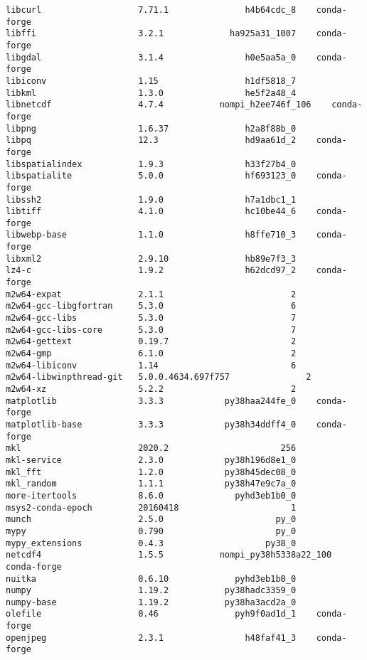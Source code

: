 \begin{Verbatim}
libcurl                   7.71.1               h4b64cdc_8    conda-forge
libffi                    3.2.1             ha925a31_1007    conda-forge
libgdal                   3.1.4                h0e5aa5a_0    conda-forge
libiconv                  1.15                 h1df5818_7
libkml                    1.3.0                he5f2a48_4
libnetcdf                 4.7.4           nompi_h2ee746f_106    conda-forge
libpng                    1.6.37               h2a8f88b_0
libpq                     12.3                 hd9aa61d_2    conda-forge
libspatialindex           1.9.3                h33f27b4_0
libspatialite             5.0.0                hf693123_0    conda-forge
libssh2                   1.9.0                h7a1dbc1_1
libtiff                   4.1.0                hc10be44_6    conda-forge
libwebp-base              1.1.0                h8ffe710_3    conda-forge
libxml2                   2.9.10               hb89e7f3_3
lz4-c                     1.9.2                h62dcd97_2    conda-forge
m2w64-expat               2.1.1                         2
m2w64-gcc-libgfortran     5.3.0                         6
m2w64-gcc-libs            5.3.0                         7
m2w64-gcc-libs-core       5.3.0                         7
m2w64-gettext             0.19.7                        2
m2w64-gmp                 6.1.0                         2
m2w64-libiconv            1.14                          6
m2w64-libwinpthread-git   5.0.0.4634.697f757               2
m2w64-xz                  5.2.2                         2
matplotlib                3.3.3            py38haa244fe_0    conda-forge
matplotlib-base           3.3.3            py38h34ddff4_0    conda-forge
mkl                       2020.2                      256
mkl-service               2.3.0            py38h196d8e1_0
mkl_fft                   1.2.0            py38h45dec08_0
mkl_random                1.1.1            py38h47e9c7a_0
more-itertools            8.6.0              pyhd3eb1b0_0
msys2-conda-epoch         20160418                      1
munch                     2.5.0                      py_0
mypy                      0.790                      py_0
mypy_extensions           0.4.3                    py38_0
netcdf4                   1.5.5           nompi_py38h5338a22_100    conda-forge
nuitka                    0.6.10             pyhd3eb1b0_0
numpy                     1.19.2           py38hadc3359_0
numpy-base                1.19.2           py38ha3acd2a_0
olefile                   0.46               pyh9f0ad1d_1    conda-forge
openjpeg                  2.3.1                h48faf41_3    conda-forge

\end{Verbatim}
